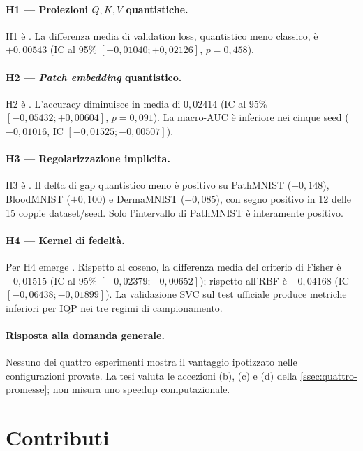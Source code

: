 \paragraph{H1 --- Proiezioni \texorpdfstring{$Q,K,V$}{Q,K,V} quantistiche.}
H1 è \nonsupportata. La differenza media di validation loss, quantistico meno
classico, è $+0{,}00543$ (IC al 95\% $[-0{,}01040;+0{,}02126]$, $p=0{,}458$).

\paragraph{H2 --- \emph{Patch embedding} quantistico.}
H2 è \nonsupportata. L'accuracy diminuisce in media di $0{,}02414$ (IC al 95\%
$[-0{,}05432;+0{,}00604]$, $p=0{,}091$). La macro-AUC è inferiore nei cinque seed
($-0{,}01016$, IC $[-0{,}01525;-0{,}00507]$).

\paragraph{H3 --- Regolarizzazione implicita.}
H3 è \nonsupportata. Il delta di gap quantistico meno  è
positivo su PathMNIST ($+0{,}148$), BloodMNIST ($+0{,}100$) e DermaMNIST
($+0{,}085$), con segno positivo in 12 delle 15 coppie dataset/seed. Solo
l'intervallo di PathMNIST è interamente positivo.

\paragraph{H4 --- Kernel di fedeltà.}
Per H4 emerge \evidenzacontraria. Rispetto al coseno, la differenza media del
criterio di Fisher è $-0{,}01515$ (IC al 95\% $[-0{,}02379;-0{,}00652]$); rispetto all'RBF
è $-0{,}04168$ (IC $[-0{,}06438;-0{,}01899]$). La validazione SVC sul test
ufficiale produce metriche inferiori per IQP nei tre regimi di campionamento.

\paragraph{Risposta alla domanda generale.} Nessuno dei quattro esperimenti
mostra il vantaggio ipotizzato nelle configurazioni provate. La tesi valuta le
accezioni (b), (c) e (d) della \cref{ssec:quattro-promesse}; non misura uno
speedup computazionale.

\section{Contributi}
\label{sec:contributi-finali}


